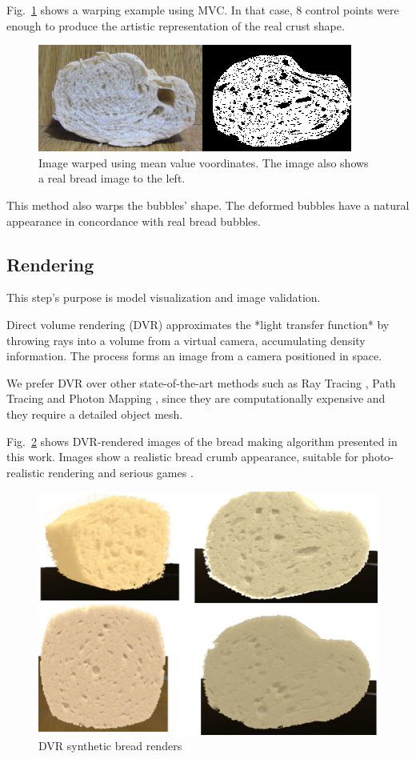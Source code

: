 \documentclass[final,5p,times]{elsarticle}
\begin{document}
Fig.~\ref{Fig5} shows a warping example using MVC. In that case, $8$ control points were enough to produce the artistic representation of the real crust shape. 

\begin{figure}[h!]
\includegraphics[scale=0.65]{warping.png}
\caption{Image warped using mean value voordinates. The image also shows a real bread image to the left. }
\label{Fig5}
\end{figure}


This method also warps the bubbles' shape. The deformed bubbles have a natural appearance in concordance with real bread bubbles.


\subsection{Rendering}
This step's purpose is model visualization and image validation.

Direct volume rendering (DVR) \cite{Levoy1988, Max1995,Kruger2003} approximates the *light transfer function* \cite{} by throwing rays into a volume from a virtual camera, accumulating density information. The process forms an image from a camera positioned in space.

We prefer DVR over other state-of-the-art methods such as Ray Tracing \cite{Whitted1980,Singh2010}, Path Tracing \cite{Lafortune1993} and Photon Mapping \cite{Jensen1996}, since they are computationally expensive and they require a detailed object mesh.

Fig.~\ref{Fig6} shows DVR-rendered images  of the bread making algorithm presented in this work. Images show a realistic bread crumb appearance, suitable for photo-realistic rendering
and serious games \cite{Susi2007}.

\begin{figure}[h!]
\includegraphics[scale=0.2]{render.png}
\caption{DVR synthetic bread renders}
\label{Fig6}
\end{figure}
\end{document}

